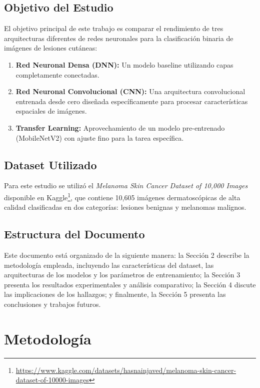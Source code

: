 \documentclass[11pt, a4paper]{article}
\begin{document}
\subsection{Objetivo del Estudio}

El objetivo principal de este trabajo es comparar el rendimiento de tres arquitecturas diferentes de redes neuronales para la clasificación binaria de imágenes de lesiones cutáneas:

\begin{enumerate}
    \item \textbf{Red Neuronal Densa (DNN):} Un modelo baseline utilizando capas completamente conectadas.
    \item \textbf{Red Neuronal Convolucional (CNN):} Una arquitectura convolucional entrenada desde cero diseñada específicamente para procesar características espaciales de imágenes.
    \item \textbf{Transfer Learning:} Aprovechamiento de un modelo pre-entrenado (MobileNetV2) con ajuste fino para la tarea específica.
\end{enumerate}

\subsection{Dataset Utilizado}

Para este estudio se utilizó el \textit{Melanoma Skin Cancer Dataset of 10,000 Images} disponible en Kaggle\footnote{\url{https://www.kaggle.com/datasets/hasnainjaved/melanoma-skin-cancer-dataset-of-10000-images}}, que contiene 10,605 imágenes dermatoscópicas de alta calidad clasificadas en dos categorías: lesiones benignas y melanomas malignos.

\subsection{Estructura del Documento}

Este documento está organizado de la siguiente manera: la Sección 2 describe la metodología empleada, incluyendo las características del dataset, las arquitecturas de los modelos y los parámetros de entrenamiento; la Sección 3 presenta los resultados experimentales y análisis comparativo; la Sección 4 discute las implicaciones de los hallazgos; y finalmente, la Sección 5 presenta las conclusiones y trabajos futuros.

\section{Metodología}
\end{document}
